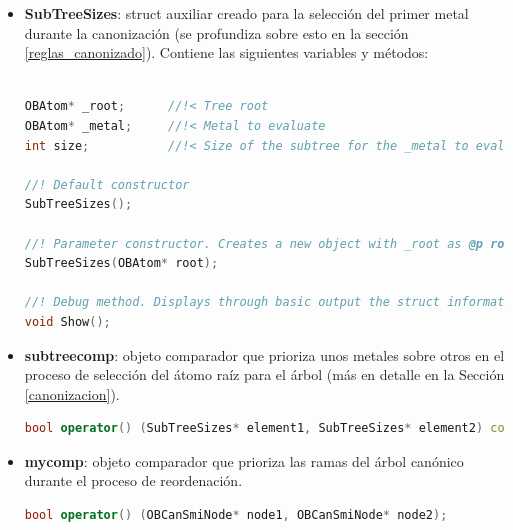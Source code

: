 \begin{itemize}
\begin{lstlisting}[language=C++]
//! Finds the ring of which the carbon with idx @p carbonIdx is a part of, among the rings of @p rlist (obtained from a SSSR perspective), and stores it in @p result.
//! \returns whether it was found or not
bool FindRingWithCarbon(vector<OBRing*>& rlist, int carbonIdx, OBRing*& result);

//! Canonize the input SMILES and identify blocks
void CanonizeOgm(OBMol* mol, OBConversion* pConv); 
    \end{lstlisting}


    
    \item \textbf{SubTreeSizes}: struct auxiliar creado para la selección del primer metal durante la canonización (se profundiza sobre esto en la sección \ref{reglas_canonizado}). Contiene las siguientes variables y métodos:
    \begin{lstlisting}[language=C++]

OBAtom* _root;      //!< Tree root
OBAtom* _metal;     //!< Metal to evaluate
int size;           //!< Size of the subtree for the _metal to evaluate

//! Default constructor
SubTreeSizes();

//! Parameter constructor. Creates a new object with _root as @p root
SubTreeSizes(OBAtom* root);

//! Debug method. Displays through basic output the struct information.
void Show();
    \end{lstlisting}


    \item \textbf{subtreecomp}: objeto comparador que prioriza unos metales sobre otros en el proceso de selección del átomo raíz para el árbol (más en detalle en la Sección \ref{canonizacion}).
    \begin{lstlisting}[language=C++]
bool operator() (SubTreeSizes* element1, SubTreeSizes* element2) const;
    \end{lstlisting}


    \item \textbf{mycomp}: objeto comparador que prioriza las ramas del árbol canónico durante el proceso de reordenación.
    \begin{lstlisting}[language=C++]
bool operator() (OBCanSmiNode* node1, OBCanSmiNode* node2);
    \end{lstlisting}


\end{itemize}




















